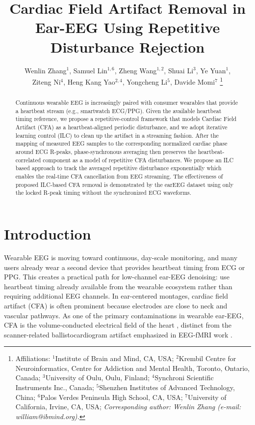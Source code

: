 \documentclass[conference]{IEEEtran}
\begin{document}
\title{Cardiac Field Artifact Removal in Ear-EEG Using Repetitive Disturbance Rejection}

\author{
Wenlin Zhang$^{1}$, Samuel Lin$^{1,6}$, Zheng Wang$^{1,2}$, Shuai Li$^{3}$, Ye Yuan$^{1}$,\\
 Ziteng Ni$^{4}$, Heng Kang Yao$^{2,4}$, Yongcheng Li$^{5}$, Davide Momi$^{7}$%
\thanks{\footnotesize
Affiliations: $^{1}$Institute of Brain and Mind, CA, USA; $^{2}$Krembil Centre for Neuroinformatics, 
Centre for Addiction and Mental Health, Toronto, Ontario, Canada;
 $^{3}$University of Oulu, Oulu, Finland; $^{4}$Synchroni Scientific Instruments Inc., Canada; 
 $^{5}$Shenzhen Institutes of Advanced Technology, China;
  $^{6}$Palos Verdes Peninsula High School, CA, USA; $^{7}$University of California, Irvine, CA, USA; 
  \textit{Corresponding author: Wenlin Zhang (e-mail: william@ibmind.org).}
}
}

\maketitle

\begin{abstract}
Continuous wearable EEG is increasingly paired with consumer wearables that provide a 
heartbeat stream (e.g., smartwatch ECG/PPG). Given the available heartbeat timing reference, we propose a 
repetitive-control framework that models Cardiac Field Artifact (CFA) as a heartbeat-aligned periodic 
disturbance, and we adopt iterative learning control (ILC) to clean up the artifact in a streaming fashion.
After the mapping of measured EEG samples to the corresponding normalized cardiac phase around ECG R-peaks,
phase-synchronous averaging then preserves the heartbeat-correlated component as a model of repetitive CFA disturbances. 
We propose an ILC based approach to track the averaged repetitive disturbance  exponentially which enables the real-time CFA cancellation from 
EEG streaming. The effectiveness of proposed ILC-based CFA removal is demonstrated by the earEEG dataset using only 
the locked R-peak timing without the synchronized ECG waveforms.
\end{abstract}

\section{Introduction}
\label{sec:introduction}

Wearable EEG is moving toward continuous, day-scale monitoring, and many users already wear a second 
device that provides heartbeat timing from ECG or PPG. This creates a practical path for low-channel 
ear-EEG denoising: use heartbeat timing already available from the wearable ecosystem rather than 
requiring additional EEG channels. In ear-centered montages, cardiac field artifact (CFA) is often 
prominent because electrodes are close to neck and vascular pathways. As one of the primary contaminations in wearable ear-EEG, 
CFA is the volume-conducted 
electrical field of the heart \cite{dirlich1997}, distinct from the scanner-related 
ballistocardiogram artifact emphasized in EEG-fMRI work \cite{niazy2005}. 
\end{document}
